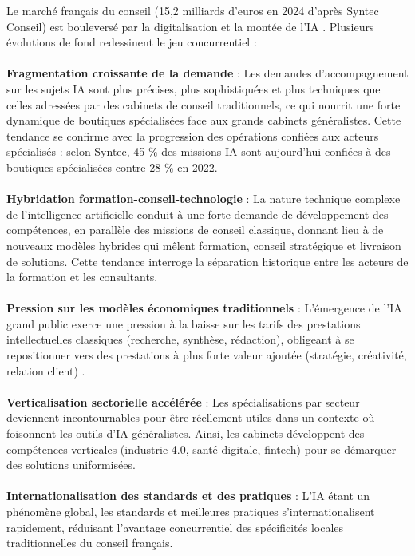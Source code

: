 Le marché français du conseil (15,2 milliards d'euros en 2024 d'après Syntec Conseil) est bouleversé par la digitalisation et la montée de l'IA \cite{syntec2024ai}. Plusieurs évolutions de fond redessinent le jeu concurrentiel :
\\\\
\textbf{Fragmentation croissante de la demande} : Les demandes d’accompagnement sur les sujets IA sont plus précises, plus sophistiquées et plus techniques que celles adressées par des cabinets de conseil traditionnels, ce qui nourrit une forte dynamique de boutiques spécialisées face aux grands cabinets généralistes. Cette tendance se confirme avec la progression des opérations confiées aux acteurs spécialisés : selon Syntec, 45 \% des missions IA sont aujourd’hui confiées à des boutiques spécialisées contre 28 \% en 2022.
\\\\
\textbf{Hybridation formation-conseil-technologie} : La nature technique complexe de l’intelligence artificielle conduit à une forte demande de développement des compétences, en parallèle des missions de conseil classique, donnant lieu à de nouveaux modèles hybrides qui mêlent formation, conseil stratégique et livraison de solutions. Cette tendance interroge la séparation historique entre les acteurs de la formation et les consultants.
\\\\
\textbf{Pression sur les modèles économiques traditionnels} : L’émergence de l’IA grand public exerce une pression à la baisse sur les tarifs des prestations intellectuelles classiques (recherche, synthèse, rédaction), obligeant à se repositionner vers des prestations à plus forte valeur ajoutée (stratégie, créativité, relation client) \cite{mckinsey2023consulting_ai}.
\\\\
\textbf{Verticalisation sectorielle accélérée} : Les spécialisations par secteur deviennent incontournables pour être réellement utiles dans un contexte où foisonnent les outils d'IA généralistes. Ainsi, les cabinets développent des compétences verticales (industrie 4.0, santé digitale, fintech) pour se démarquer des solutions uniformisées.
\\\\
\textbf{Internationalisation des standards et des pratiques} : L'IA étant un phénomène global, les standards et meilleures pratiques s'internationalisent rapidement, réduisant l'avantage concurrentiel des spécificités locales traditionnelles du conseil français.

